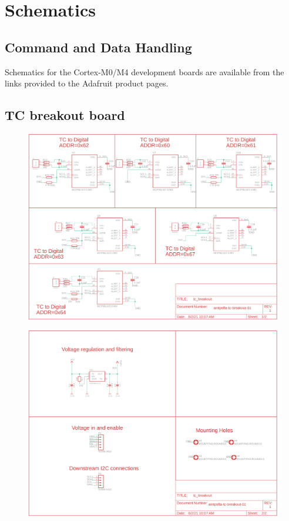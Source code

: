 \documentclass{article}
\begin{document}
\section{Schematics}
\label{appa}

\subsection{Command and Data Handling}
Schematics for the Cortex-M0/M4 development boards are available from the links provided to the Adafruit product pages.

\subsection{TC breakout board}

\begin{figure}[H]
	\centering
	\includegraphics[width=\textwidth]{images/tc-breakout-p1}
	\label{fig:schematic-tc-breakout-p1}
\end{figure}

\begin{figure}[H]
	\centering
	\includegraphics[width=\textwidth]{images/tc-breakout-p2}
	\label{fig:schematic-tc-breakout-p2}
\end{figure}
\end{document}
